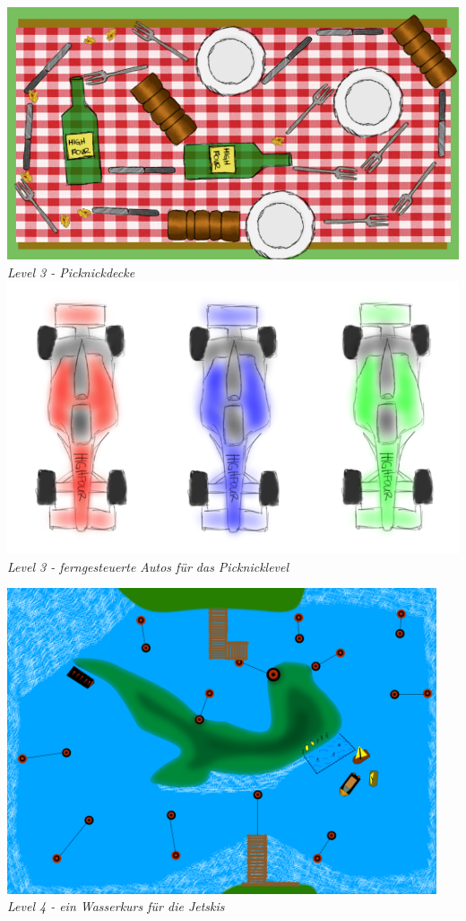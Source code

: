 \begin{flushright}
\includegraphics[width=1\textwidth]{img/picknick.png}
\textit{Level 3 - Picknickdecke}\\[3em]

\includegraphics[width=1\textwidth]{img/autos.png}
\textit{Level 3 - ferngesteuerte Autos für das Picknicklevel}

\newpage

\includegraphics[width=0.95\textwidth]{img/wasserkurs.png}\\
\textit{Level 4 - ein Wasserkurs für die Jetskis}\\[3em]


\end{flushright}
